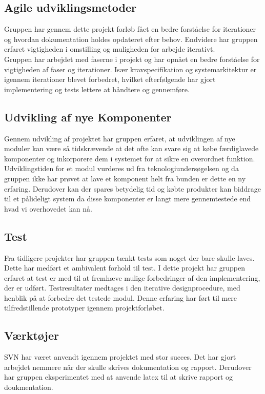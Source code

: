 \subsection{Agile udviklingsmetoder}
Gruppen har gennem dette projekt forløb fået en bedre forståelse for iterationer og hvordan dokumentation holdes opdateret efter behov. Endvidere har gruppen erfaret vigtigheden i omstilling og muligheden for arbejde iterativt.\\
Gruppen har arbejdet med faserne i projekt og har opnået en bedre forståelse for vigtigheden af faser og iterationer. Især kravspecifikation og systemarkitektur er igennem iterationer blevet forbedret, hvilket efterfølgende har gjort implementering og tests lettere at håndtere og gennemføre.\\


\subsection{Udvikling af nye Komponenter}
Gennem udvikling af projektet har gruppen erfaret, at udviklingen af nye moduler kan være så tidskrævende at det ofte kan svare sig at købe færdiglavede komponenter og inkorporere dem i systemet for at sikre en overordnet funktion. Udviklingstiden for et modul vurderes ud fra teknologiundersøgelsen og da gruppen ikke har prøvet at lave et komponent helt fra bunden er dette en ny erfaring. Derudover kan der spares betydelig tid og købte produkter kan biddrage til et pålideligt system da disse komponenter er langt mere gennemtestede end hvad vi overhovedet kan nå.

\subsection{Test}
Fra tidligere projekter har gruppen tænkt tests som noget der bare skulle laves. Dette har medført et ambivalent forhold til test. I dette projekt har gruppen erfaret at test er med til at fremhæve mulige forbedringer af den implementering, der er udført. Testresultater medtages i den iterative designprocedure, med henblik på at forbedre det testede modul. Denne erfaring har ført til mere tilfredstillende prototyper igennem projektforløbet.

\subsection{Værktøjer}
SVN har været anvendt igennem projektet med stor succes. Det har gjort arbejdet nemmere når der skulle skrives dokumentation og rapport. Derudover har gruppen eksperimentet med at anvende latex til at skrive rapport og doukmentation.



